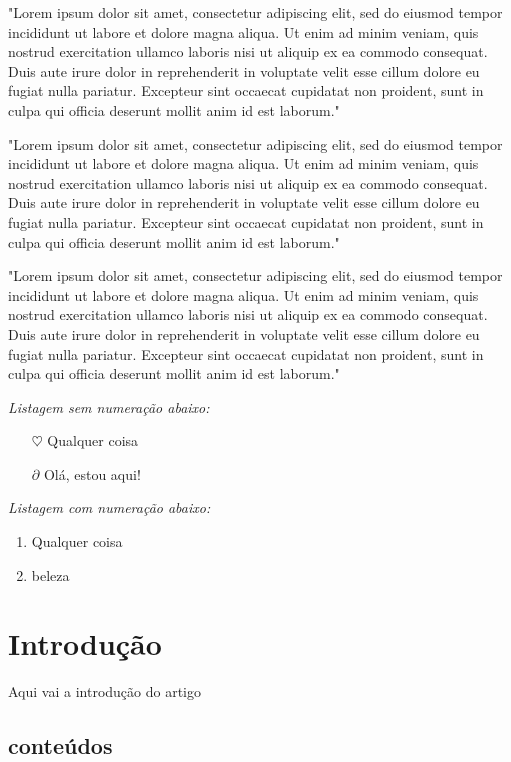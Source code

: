 \documentclass[12pt, a4paper]{article}
\begin{document}
"Lorem ipsum dolor sit amet, consectetur adipiscing elit, sed do eiusmod tempor incididunt ut labore et dolore magna aliqua. Ut enim ad minim veniam, quis nostrud exercitation ullamco laboris nisi ut aliquip ex ea commodo consequat. Duis aute irure dolor in reprehenderit in voluptate velit esse cillum dolore eu fugiat nulla pariatur. Excepteur sint occaecat cupidatat non proident, sunt in culpa qui officia deserunt mollit anim id est laborum."

"Lorem ipsum dolor sit amet, consectetur adipiscing elit, sed do eiusmod tempor incididunt ut labore et dolore magna aliqua. Ut enim ad minim veniam, quis nostrud exercitation ullamco laboris nisi ut aliquip ex ea commodo consequat. Duis aute irure dolor in reprehenderit in voluptate velit esse cillum dolore eu fugiat nulla pariatur. Excepteur sint occaecat cupidatat non proident, sunt in culpa qui officia deserunt mollit anim id est laborum."

"Lorem ipsum dolor sit amet, consectetur adipiscing elit, sed do eiusmod tempor incididunt ut labore et dolore magna aliqua. Ut enim ad minim veniam, quis nostrud exercitation ullamco laboris nisi ut aliquip ex ea commodo consequat. Duis aute irure dolor in reprehenderit in voluptate velit esse cillum dolore eu fugiat nulla pariatur. Excepteur sint occaecat cupidatat non proident, sunt in culpa qui officia deserunt mollit anim id est laborum."

\textit{Listagem sem numeração abaixo:}

\begin{itemize}
	\item[$\heartsuit$] Qualquer coisa
	\item[$\partial$] Olá, estou aqui!
\end{itemize}

\textit{Listagem com numeração abaixo:}

\begin{enumerate}
	\item Qualquer coisa
	\item beleza
\end{enumerate}

\section{Introdução}

Aqui vai a introdução do artigo

\subsection{conteúdos}
\end{document}
